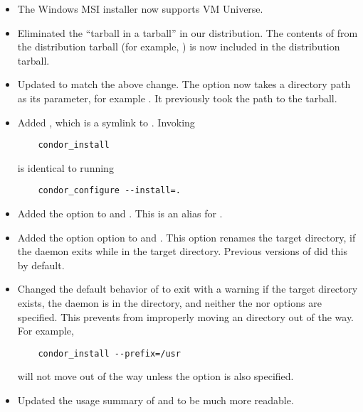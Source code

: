 \begin{itemize}

\item The Windows MSI installer now supports VM Universe.

\item Eliminated the ``tarball in a tarball'' in our distribution.
  The contents of  from the distribution tarball
  (for example, ) is now
  included in the distribution tarball.

\item Updated  to match the above change.  The
   option now takes a directory path as its parameter,
  for example .
  It previously took the path to
  the  tarball.

\item Added , which is a symlink to .
  Invoking 
\begin{verbatim}
    condor_install
\end{verbatim}
  is identical to running
\begin{verbatim}
    condor_configure --install=.
\end{verbatim}

\item Added the option  to  and
  .  This is an alias for .

\item Added the option  option to  and
  .  This option renames the target  directory,
  if the  daemon exits while in the target  directory.
  Previous versions of  did this by default.

\item Changed the default behavior of  to exit with a
  warning if the target  directory exists,
  the  daemon is in the  directory,
  and neither the  nor  options are specified.
  This prevents  from improperly moving an 
  directory out of the way.
  For example,
\begin{verbatim}
    condor_install --prefix=/usr
\end{verbatim}
  will not move  out of the way unless
  the  option is also specified.

\item Updated the usage summary of  and
   to be much more readable.

\end{itemize}

